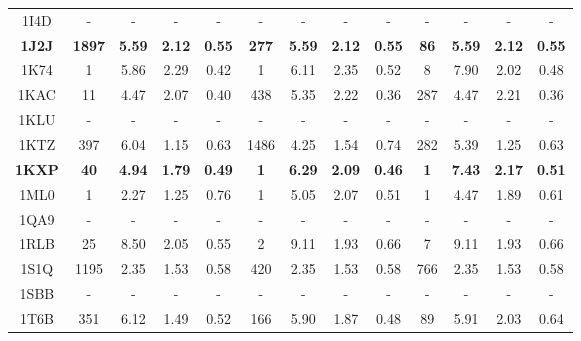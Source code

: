 \begin{longtable}{c c c c c|c c c c|c c c c}
 {\tiny 1I4D} &{\tiny -}&{\tiny -}&{\tiny -}&{\tiny -} &{\tiny -}&{\tiny -}&{\tiny -}&{\tiny -} &{\tiny -}&{\tiny -}&{\tiny -}&{\tiny -}\\ 
 \textbf{\tiny 1J2J} &\textbf{\tiny 1897}&\textbf{\tiny 5.59}&\textbf{\tiny 2.12}&\textbf{\tiny 0.55} &\textbf{\tiny 277}&\textbf{\tiny 5.59}&\textbf{\tiny 2.12}&\textbf{\tiny 0.55} &\textbf{\tiny 86}&\textbf{\tiny 5.59}&\textbf{\tiny 2.12}&\textbf{\tiny 0.55}\\ 
 {\tiny 1K74} &{\tiny 1}&{\tiny 5.86}&{\tiny 2.29}&{\tiny 0.42} &{\tiny 1}&{\tiny 6.11}&{\tiny 2.35}&{\tiny 0.52} &{\tiny 8}&{\tiny 7.90}&{\tiny 2.02}&{\tiny 0.48}\\ 
 {\tiny 1KAC} &{\tiny 11}&{\tiny 4.47}&{\tiny 2.07}&{\tiny 0.40} &{\tiny 438}&{\tiny 5.35}&{\tiny 2.22}&{\tiny 0.36} &{\tiny 287}&{\tiny 4.47}&{\tiny 2.21}&{\tiny 0.36}\\ 
 {\tiny 1KLU} &{\tiny -}&{\tiny -}&{\tiny -}&{\tiny -} &{\tiny -}&{\tiny -}&{\tiny -}&{\tiny -} &{\tiny -}&{\tiny -}&{\tiny -}&{\tiny -}\\ 
 {\tiny 1KTZ} &{\tiny 397}&{\tiny 6.04}&{\tiny 1.15}&{\tiny 0.63} &{\tiny 1486}&{\tiny 4.25}&{\tiny 1.54}&{\tiny 0.74} &{\tiny 282}&{\tiny 5.39}&{\tiny 1.25}&{\tiny 0.63}\\ 
 \textbf{\tiny 1KXP} &\textbf{\tiny 40}&\textbf{\tiny 4.94}&\textbf{\tiny 1.79}&\textbf{\tiny 0.49} &\textbf{\tiny 1}&\textbf{\tiny 6.29}&\textbf{\tiny 2.09}&\textbf{\tiny 0.46} &\textbf{\tiny 1}&\textbf{\tiny 7.43}&\textbf{\tiny 2.17}&\textbf{\tiny 0.51}\\ 
 {\tiny 1ML0} &{\tiny 1}&{\tiny 2.27}&{\tiny 1.25}&{\tiny 0.76} &{\tiny 1}&{\tiny 5.05}&{\tiny 2.07}&{\tiny 0.51} &{\tiny 1}&{\tiny 4.47}&{\tiny 1.89}&{\tiny 0.61}\\ 
 {\tiny 1QA9} &{\tiny -}&{\tiny -}&{\tiny -}&{\tiny -} &{\tiny -}&{\tiny -}&{\tiny -}&{\tiny -} &{\tiny -}&{\tiny -}&{\tiny -}&{\tiny -}\\ 
 {\tiny 1RLB} &{\tiny 25}&{\tiny 8.50}&{\tiny 2.05}&{\tiny 0.55} &{\tiny 2}&{\tiny 9.11}&{\tiny 1.93}&{\tiny 0.66} &{\tiny 7}&{\tiny 9.11}&{\tiny 1.93}&{\tiny 0.66}\\ 
 {\tiny 1S1Q} &{\tiny 1195}&{\tiny 2.35}&{\tiny 1.53}&{\tiny 0.58} &{\tiny 420}&{\tiny 2.35}&{\tiny 1.53}&{\tiny 0.58} &{\tiny 766}&{\tiny 2.35}&{\tiny 1.53}&{\tiny 0.58}\\ 
 {\tiny 1SBB} &{\tiny -}&{\tiny -}&{\tiny -}&{\tiny -} &{\tiny -}&{\tiny -}&{\tiny -}&{\tiny -} &{\tiny -}&{\tiny -}&{\tiny -}&{\tiny -}\\ 
 {\tiny 1T6B} &{\tiny 351}&{\tiny 6.12}&{\tiny 1.49}&{\tiny 0.52} &{\tiny 166}&{\tiny 5.90}&{\tiny 1.87}&{\tiny 0.48} &{\tiny 89}&{\tiny 5.91}&{\tiny 2.03}&{\tiny 0.64}\\ 

\end{longtable}
